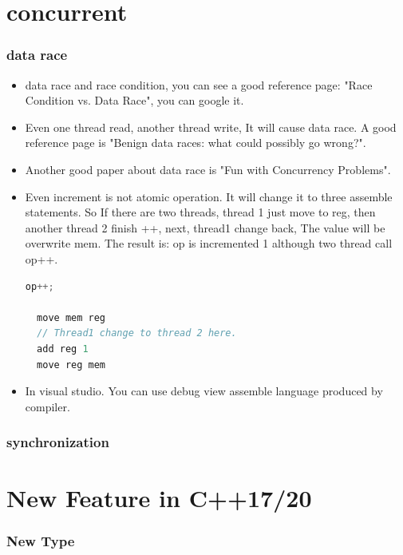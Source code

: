 \documentclass[a4paper,12pt,twoside]{book}
\begin{document}
\chapter{concurrent}
\subsection{data race}
\begin{itemize}
\item data race and race condition, you can see a good reference page: "Race Condition vs. Data Race", you can google it.

\item Even one thread read, another thread write, It will cause data race. A good reference page is "Benign data races: what could possibly go wrong?". 

\item Another good paper about data race is "Fun with Concurrency Problems".

\item Even increment is not atomic operation. It will change it to three assemble statements. So If there are two threads, thread 1 just move to reg, then another thread 2 finish ++, next, thread1 change back, The value will be overwrite mem. The result is: op is incremented 1 although two thread call op++.
\begin{lstlisting}[frame=single, language=c++]
  op++;
  
  move mem reg
  // Thread1 change to thread 2 here. 
  add reg 1
  move reg mem
\end{lstlisting}

\item In visual studio. You can use debug view assemble language produced by compiler. 
\end{itemize}

\subsection{synchronization}

\chapter{New Feature in C++17/20}

\subsection{New Type}
\end{document}
